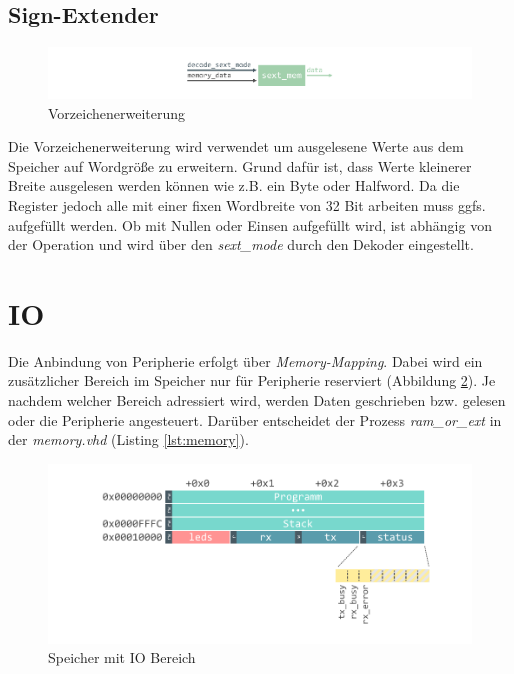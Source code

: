             


        \subsection{Sign-Extender}

            \begin{figure}[H]
                \centering
                \includegraphics[scale=1]{img/block_sext.pdf}
                \caption{Vorzeichenerweiterung}
                \label{fig:sext}
            \end{figure}

            Die Vorzeichenerweiterung wird verwendet um ausgelesene Werte aus dem Speicher auf Wordgröße
            zu erweitern. Grund dafür ist, dass Werte kleinerer Breite ausgelesen werden können wie z.B. ein
            Byte oder Halfword. Da die Register jedoch alle mit einer fixen Wordbreite von 32 Bit arbeiten muss ggfs.
            aufgefüllt werden. Ob mit Nullen oder Einsen aufgefüllt wird, ist abhängig von der Operation und wird über den
            \textit{sext\_mode} durch den Dekoder eingestellt.
            
    \section{IO}

        Die Anbindung von Peripherie erfolgt über \textit{Memory-Mapping}.
        Dabei wird ein zusätzlicher Bereich im Speicher nur für Peripherie reserviert (Abbildung \ref{fig:io}).
        Je nachdem welcher Bereich adressiert wird, werden Daten geschrieben bzw. gelesen
        oder die Peripherie angesteuert. Darüber entscheidet der Prozess \textit{ram\_or\_ext}
        in der \textit{memory.vhd} (Listing \ref{lst:memory}).

        \begin{figure}[H]
            \centering
            \includegraphics[scale=1]{img/memory.pdf}
            \caption{Speicher mit IO Bereich}
            \label{fig:io}
        \end{figure}

